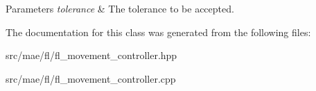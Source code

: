 \begin{DoxyParams}{Parameters}
{\em tolerance} & The tolerance to be accepted. \\
\hline
\end{DoxyParams}


The documentation for this class was generated from the following files\-:\begin{DoxyCompactItemize}
\item 
src/mae/fl/fl\-\_\-movement\-\_\-controller.\-hpp\item 
src/mae/fl/fl\-\_\-movement\-\_\-controller.\-cpp\end{DoxyCompactItemize}
